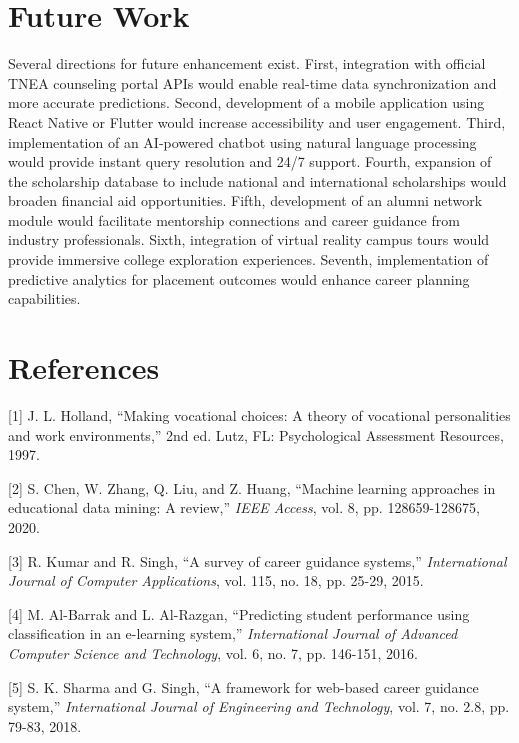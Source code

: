 \documentclass[journal]{IEEEtran}
\begin{document}
\section{Future Work}

Several directions for future enhancement exist. First, integration with official TNEA counseling portal APIs would enable real-time data synchronization and more accurate predictions. Second, development of a mobile application using React Native or Flutter would increase accessibility and user engagement. Third, implementation of an AI-powered chatbot using natural language processing would provide instant query resolution and 24/7 support. Fourth, expansion of the scholarship database to include national and international scholarships would broaden financial aid opportunities. Fifth, development of an alumni network module would facilitate mentorship connections and career guidance from industry professionals. Sixth, integration of virtual reality campus tours would provide immersive college exploration experiences. Seventh, implementation of predictive analytics for placement outcomes would enhance career planning capabilities.

\section{References}

[1] J. L. Holland, ``Making vocational choices: A theory of vocational personalities and work environments,'' 2nd ed. Lutz, FL: Psychological Assessment Resources, 1997.

[2] S. Chen, W. Zhang, Q. Liu, and Z. Huang, ``Machine learning approaches in educational data mining: A review,'' \textit{IEEE Access}, vol. 8, pp. 128659-128675, 2020.

[3] R. Kumar and R. Singh, ``A survey of career guidance systems,'' \textit{International Journal of Computer Applications}, vol. 115, no. 18, pp. 25-29, 2015.

[4] M. Al-Barrak and L. Al-Razgan, ``Predicting student performance using classification in an e-learning system,'' \textit{International Journal of Advanced Computer Science and Technology}, vol. 6, no. 7, pp. 146-151, 2016.

[5] S. K. Sharma and G. Singh, ``A framework for web-based career guidance system,'' \textit{International Journal of Engineering and Technology}, vol. 7, no. 2.8, pp. 79-83, 2018.
\end{document}
